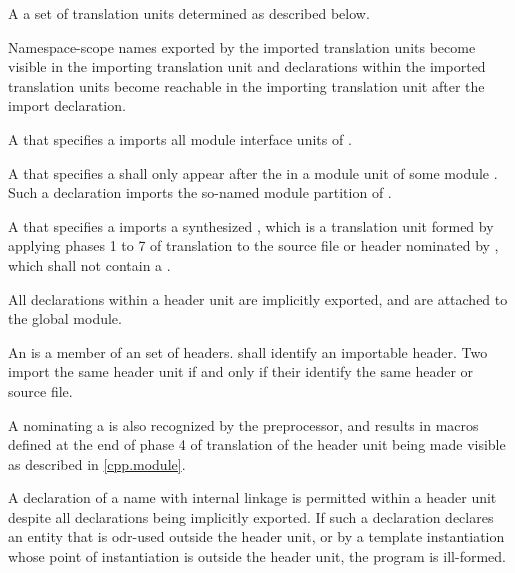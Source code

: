 \pnum
A   a set of
translation units determined as described below.
\begin{note}
Namespace-scope names exported by the imported translation units
become visible
in the importing translation unit
and declarations within the imported translation units
become reachable
in the importing translation unit
after the import declaration.
\end{note}

\pnum
A  that specifies
a  
imports all module interface units of .

\pnum
A  that specifies
a  shall only appear after
the  in a module unit of
some module .
Such a declaration imports the so-named
module partition of .

\pnum
A  that specifies
a   imports
a synthesized ,
which is a translation unit formed by applying
phases 1 to 7 of translation
to the source file or header nominated by ,
which shall not contain a .
\begin{note}
All declarations within a header unit are implicitly
exported,
and are attached to the global module.
\end{note}
An  is a member of an
set of headers.
 shall identify an importable header.
Two
import the same header unit if and only if
their  identify the same
header or source file.
\begin{note}
A  nominating
a  is also recognized by the
preprocessor, and results in macros defined at the
end of phase 4 of translation of the header unit
being made visible as described in \ref{cpp.module}.
\end{note}
A declaration of a name with internal linkage is
permitted within a header unit despite all
declarations being implicitly exported.
If such a declaration declares an entity
that is odr-used outside the
header unit, or by a template
instantiation whose point of instantiation is outside
the header unit, the program is ill-formed.

